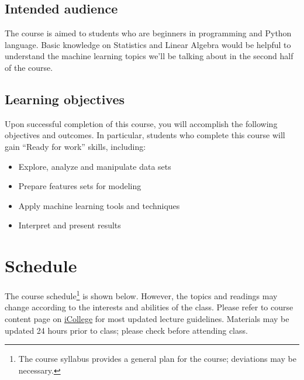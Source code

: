 \documentclass{article}
\begin{document}
\subsection{Intended audience}
The course is aimed to students who are beginners in programming and Python language. Basic knowledge on Statistics and Linear Algebra would be helpful to understand the machine learning topics we'll be talking about in the second half of the course.


\subsection{Learning objectives}
Upon successful completion of this course, you will accomplish the following objectives and outcomes. In particular, students who complete this course will gain “Ready for work” skills, including:\\
\begin{itemize}
  \item Explore, analyze and manipulate data sets
  \item Prepare features sets for modeling
  \item Apply machine learning tools and techniques
  \item Interpret and present results
\end{itemize}


\section{Schedule}
The course schedule\footnote{The course syllabus provides a general plan for the course; deviations may be necessary.} is shown below. However, the topics and readings may change according to the interests and abilities of the class. Please refer to course content page on \href{https://gastate.view.usg.edu/d2l/home/2822689}{iCollege} for most updated lecture guidelines.  Materials may be updated 24 hours prior to class; please check before attending class.
\end{document}
